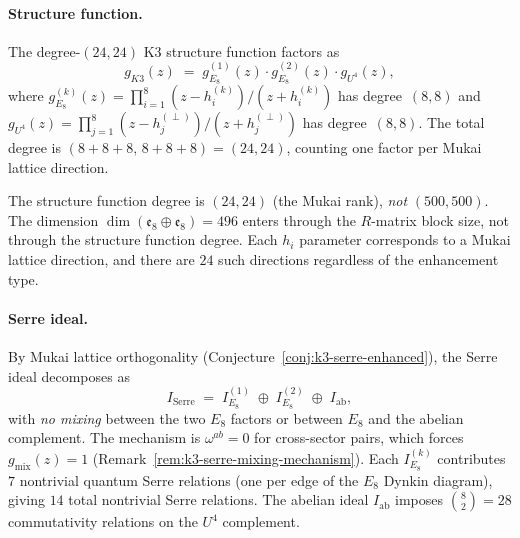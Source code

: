 \paragraph{Structure function.}
The degree-$(24, 24)$ K3 structure function factors as
\begin{equation}\label{eq:k3-e8e8-structure-fn}
 g_{K3}(z)
 \;=\;
 g_{E_8}^{(1)}(z) \cdot g_{E_8}^{(2)}(z) \cdot g_{U^4}(z),
\end{equation}
where $g_{E_8}^{(k)}(z) = \prod_{i=1}^{8} (z - h_i^{(k)})/(z + h_i^{(k)})$ has degree~$(8,8)$ and $g_{U^4}(z) = \prod_{j=1}^{8}(z - h_j^{(\perp)})/(z + h_j^{(\perp)})$ has degree~$(8,8)$. The total degree is $(8 + 8 + 8,\, 8 + 8 + 8) = (24, 24)$, counting one factor per Mukai lattice direction.

\begin{remark}
\label{rem:k3-e8e8-degree}
The structure function degree is $(24, 24)$ (the Mukai rank), \emph{not} $(500, 500)$. The dimension $\dim(\mathfrak{e}_8 \oplus \mathfrak{e}_8) = 496$ enters through the $R$-matrix block size, not through the structure function degree. Each $h_i$ parameter corresponds to a Mukai lattice direction, and there are $24$ such directions regardless of the enhancement type.
\end{remark}

\paragraph{Serre ideal.}
By Mukai lattice orthogonality (Conjecture~\ref{conj:k3-serre-enhanced}), the Serre ideal decomposes as
\begin{equation}\label{eq:k3-e8e8-serre}
 I_{\mathrm{Serre}}
 \;=\;
 I_{E_8}^{(1)} \;\oplus\; I_{E_8}^{(2)} \;\oplus\; I_{\mathrm{ab}},
\end{equation}
with \emph{no mixing} between the two $E_8$ factors or between $E_8$ and the abelian complement. The mechanism is $\omega^{ab} = 0$ for cross-sector pairs, which forces $g_{\mathrm{mix}}(z) = 1$ (Remark~\ref{rem:k3-serre-mixing-mechanism}). Each $I_{E_8}^{(k)}$ contributes $7$ nontrivial quantum Serre relations (one per edge of the $E_8$ Dynkin diagram), giving $14$ total nontrivial Serre relations. The abelian ideal $I_{\mathrm{ab}}$ imposes $\binom{8}{2} = 28$ commutativity relations on the $U^4$ complement.

